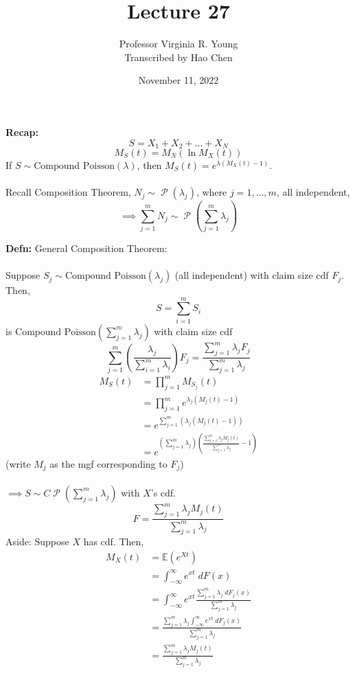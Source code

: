 \documentclass[a4paper]{article}
\title{Lecture 27}
\author{Professor Virginia R. Young\\ \small{Transcribed by Hao Chen}}
\date{November 11, 2022}
\newcommand{\n}{\hfill\break}
\newcommand{\defn}[1]{\par\noindent\settowidth{\hangindent}{\textbf{Defn: }}\textbf{Defn: }#1\n}
\newcommand{\recap}[1]{\par\noindent\settowidth{\hangindent}{\textbf{Recap: }}\textbf{Recap: }#1\n}
\newcommand{\Avg}{\mathbb{E}}
\newcommand{\E}{\Avg}
\DeclareMathOperator{\Poiss}{\mathcal{P}}
\begin{document}
\maketitle

\recap{
    \[S=X_1+X_2+\dots+X_N\]
    \[M_S(t)=M_N(\ln M_X(t))\]
    If $S\sim\text{Compound Poisson}(\lambda)$, then $M_S(t)=e^{\lambda(M_X(t)-1)}$.
    \\\\
    Recall Composition Theorem, $N_j\sim\Poiss(\lambda_j)$, where $j=1,\dots,m$, all independent,
    \[\implies\sum^m_{j=1}N_j\sim\Poiss\left(\sum^m_{j=1}\lambda_j\right)\]
}

\defn{
    General Composition Theorem:
    \\\\
    Suppose $S_j\sim\text{Compound Poisson}(\lambda_j)$ (all independent) with claim size cdf $F_j$. Then, 
    \[S=\sum^m_{i=1}S_i\]
    is $\text{Compound Poisson}(\sum^m_{j=1}\lambda_j)$ with claim size cdf
    \[\sum^m_{j=1}\left(\frac{\lambda_j}{\sum^m_{i=1}\lambda_i}\right)F_j=\frac{\sum^m_{j=1}\lambda_jF_j}{\sum^m_{j=1}\lambda_j}\]
    \begin{align*}
        M_S(t)&=\prod^m_{j=1}M_{S_j}(t) \\
        &=\prod^m_{j=1}e^{\lambda_j(M_j(t)-1)} \\
        &=e^{\sum^m_{j=1}(\lambda_j(M_j(t)-1))} \\
        &=e^{(\sum^m_{j=1}\lambda_j)\left(\frac{\sum^m_{j=1}\lambda_jM_j(t)}{\sum^m_{j=1}\lambda_j}-1\right)}
    \end{align*}
    (write $M_j$ as the mgf corresponding to $F_j$)
    \\\\
    $\implies S\sim C\Poiss\left(\sum^m_{j=1}\lambda_j\right)$ with $X$'s cdf.
    \[F=\frac{\sum^m_{j=1}\lambda_jM_j(t)}{\sum^m_{j=1}\lambda_j}\]
    Aside: Suppose $X$ has cdf. Then, 
    \begin{align*}
        M_X(t)&=\E(e^{Xt}) \\
        &=\int^\infty_{-\infty}e^{xt}\;dF(x) \\
        &=\int^\infty_{-\infty}e^{xt}\frac{\sum^m_{j=1}\lambda_j\;dF_j(x)}{\sum^m_{j=1}\lambda_j} \\
        &=\frac{\sum^m_{j=1}\lambda_j\int^\infty_{-\infty}e^{xt}\;dF_j(x)}{\sum^m_{j=1}\lambda_j} \\
        &=\frac{\sum^m_{j=1}\lambda_jM_j(t)}{\sum^m_{j=1}\lambda_j}
    \end{align*}
}
\end{document}
